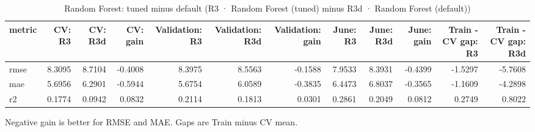 \begin{table}[htbp]
\centering
\small
\caption{Random Forest: tuned minus default (R3 · Random Forest (tuned) minus R3d · Random Forest (default))}
\begin{tabular}{lrrrrrrrrrrr}
\toprule
metric & CV: R3 & CV: R3d & CV: gain & Validation: R3 & Validation: R3d & Validation: gain & June: R3 & June: R3d & June: gain & Train - CV gap: R3 & Train - CV gap: R3d \\
\midrule
rmse & 8.3095 & 8.7104 & -0.4008 & 8.3975 & 8.5563 & -0.1588 & 7.9533 & 8.3931 & -0.4399 & -1.5297 & -5.7608 \\
mae & 5.6956 & 6.2901 & -0.5944 & 5.6754 & 6.0589 & -0.3835 & 6.4473 & 6.8037 & -0.3565 & -1.1609 & -4.2898 \\
r2 & 0.1774 & 0.0942 & 0.0832 & 0.2114 & 0.1813 & 0.0301 & 0.2861 & 0.2049 & 0.0812 & 0.2749 & 0.8022 \\
\bottomrule
\end{tabular}
\par\smallskip\begin{minipage}{\linewidth}\footnotesize Negative gain is better for RMSE and MAE. Gaps are Train minus CV mean.\end{minipage}
\end{table}

